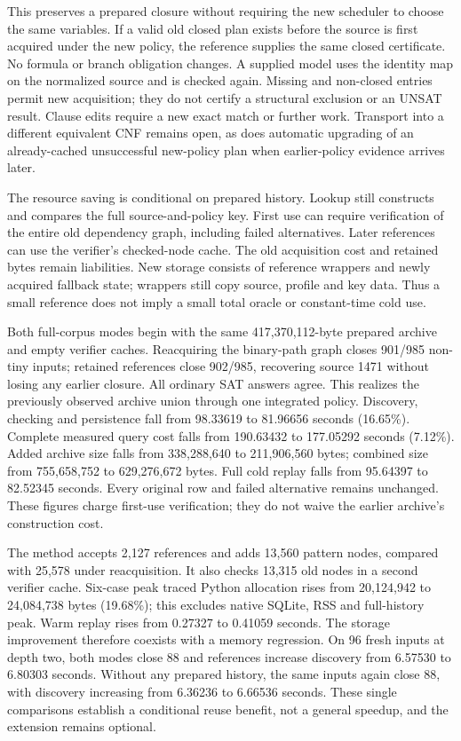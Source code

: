 \documentclass[11pt,a4paper]{article}
\numberwithin{equation}{section}
\theoremstyle{plain}
\theoremstyle{definition}
\theoremstyle{remark}
\begin{document}
This preserves a prepared closure without requiring the new scheduler to choose the same variables. If a valid old closed plan exists before the source is first acquired under the new policy, the reference supplies the same closed certificate. No formula or branch obligation changes. A supplied model uses the identity map on the normalized source and is checked again. Missing and non-closed entries permit new acquisition; they do not certify a structural exclusion or an UNSAT result. Clause edits require a new exact match or further work. Transport into a different equivalent CNF remains open, as does automatic upgrading of an already-cached unsuccessful new-policy plan when earlier-policy evidence arrives later.

The resource saving is conditional on prepared history. Lookup still constructs and compares the full source-and-policy key. First use can require verification of the entire old dependency graph, including failed alternatives. Later references can use the verifier's checked-node cache. The old acquisition cost and retained bytes remain liabilities. New storage consists of reference wrappers and newly acquired fallback state; wrappers still copy source, profile and key data. Thus a small reference does not imply a small total oracle or constant-time cold use.

Both full-corpus modes begin with the same 417,370,112-byte prepared archive and empty verifier caches. Reacquiring the binary-path graph closes 901/985 non-tiny inputs; retained references close 902/985, recovering source 1471 without losing any earlier closure. All ordinary SAT answers agree. This realizes the previously observed archive union through one integrated policy. Discovery, checking and persistence fall from 98.33619 to 81.96656 seconds (16.65\%). Complete measured query cost falls from 190.63432 to 177.05292 seconds (7.12\%). Added archive size falls from 338,288,640 to 211,906,560 bytes; combined size from 755,658,752 to 629,276,672 bytes. Full cold replay falls from 95.64397 to 82.52345 seconds. Every original row and failed alternative remains unchanged. These figures charge first-use verification; they do not waive the earlier archive's construction cost.

The method accepts 2,127 references and adds 13,560 pattern nodes, compared with 25,578 under reacquisition. It also checks 13,315 old nodes in a second verifier cache. Six-case peak traced Python allocation rises from 20,124,942 to 24,084,738 bytes (19.68\%); this excludes native SQLite, RSS and full-history peak. Warm replay rises from 0.27327 to 0.41059 seconds. The storage improvement therefore coexists with a memory regression. On 96 fresh inputs at depth two, both modes close 88 and references increase discovery from 6.57530 to 6.80303 seconds. Without any prepared history, the same inputs again close 88, with discovery increasing from 6.36236 to 6.66536 seconds. These single comparisons establish a conditional reuse benefit, not a general speedup, and the extension remains optional.
\end{document}
